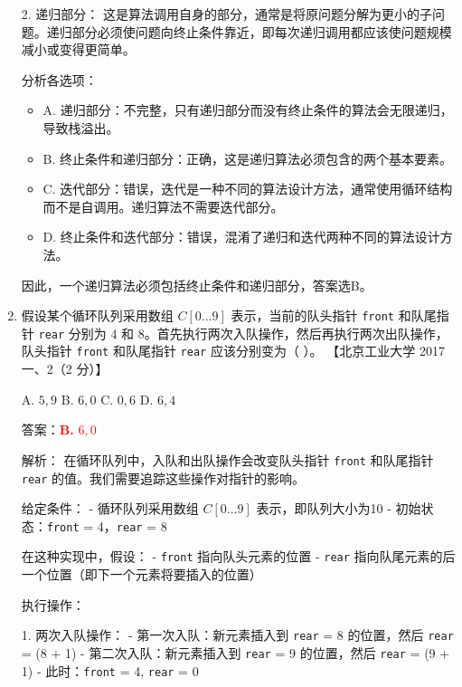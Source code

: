 \documentclass[lang=cn,newtx,10pt,scheme=chinese]{../../../elegantbook}
\begin{document}
\begin{enumerate}
    2. 递归部分：
       这是算法调用自身的部分，通常是将原问题分解为更小的子问题。递归部分必须使问题向终止条件靠近，即每次递归调用都应该使问题规模减小或变得更简单。

    分析各选项：
    \begin{itemize}
        \item A. 递归部分：不完整，只有递归部分而没有终止条件的算法会无限递归，导致栈溢出。
        
        \item B. 终止条件和递归部分：正确，这是递归算法必须包含的两个基本要素。
        
        \item C. 迭代部分：错误，迭代是一种不同的算法设计方法，通常使用循环结构而不是自调用。递归算法不需要迭代部分。
        
        \item D. 终止条件和迭代部分：错误，混淆了递归和迭代两种不同的算法设计方法。
    \end{itemize}

    因此，一个递归算法必须包括终止条件和递归部分，答案选B。

    \item 假设某个循环队列采用数组 $C[0 \ldots 9]$ 表示，当前的队头指针 \texttt{front} 和队尾指针 \texttt{rear} 分别为 $4$ 和 $8$。首先执行两次入队操作，然后再执行两次出队操作，队头指针 \texttt{front} 和队尾指针 \texttt{rear} 应该分别变为（ ）。  
    【北京工业大学 2017 一、2（2 分）】  

    A. $5, 9$ \quad B. $6, 0$ \quad C. $0, 6$ \quad D. $6, 4$  
    
    答案：\textcolor{red}{\textbf{B.} $6, 0$}

    解析：
    在循环队列中，入队和出队操作会改变队头指针 \texttt{front} 和队尾指针 \texttt{rear} 的值。我们需要追踪这些操作对指针的影响。

    给定条件：
    - 循环队列采用数组 $C[0 \ldots 9]$ 表示，即队列大小为10
    - 初始状态：\texttt{front} = 4，\texttt{rear} = 8

    在这种实现中，假设：
    - \texttt{front} 指向队头元素的位置
    - \texttt{rear} 指向队尾元素的后一个位置（即下一个元素将要插入的位置）

    执行操作：

    1. 两次入队操作：
       - 第一次入队：新元素插入到 \texttt{rear} = 8 的位置，然后 \texttt{rear} = (8 + 1) %
       - 第二次入队：新元素插入到 \texttt{rear} = 9 的位置，然后 \texttt{rear} = (9 + 1) %
       - 此时：\texttt{front} = 4, \texttt{rear} = 0


\end{enumerate}
\end{document}
